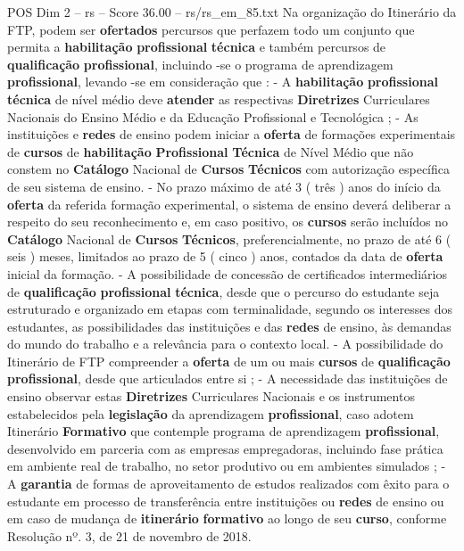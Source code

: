 \begin{textsample}{POS Dim 2 – rs – Score 36.00 – rs/rs\_em\_85.txt}
Na organização do Itinerário da FTP, podem ser \textbf{ofertados} percursos que perfazem todo um conjunto que permita a \textbf{habilitação} \textbf{profissional} \textbf{técnica} e também percursos de \textbf{qualificação} \textbf{profissional}, incluindo -se o programa de aprendizagem \textbf{profissional}, levando -se em consideração que : - A \textbf{habilitação} \textbf{profissional} \textbf{técnica} de nível médio deve \textbf{atender} as respectivas \textbf{Diretrizes} Curriculares Nacionais do Ensino Médio e da Educação Profissional e Tecnológica ; - As instituições e \textbf{redes} de ensino podem iniciar a \textbf{oferta} de formações experimentais de \textbf{cursos} de \textbf{habilitação} \textbf{Profissional} \textbf{Técnica} de Nível Médio que não constem no \textbf{Catálogo} Nacional de \textbf{Cursos} \textbf{Técnicos} com autorização específica de seu sistema de ensino. - No prazo máximo de até 3 ( três ) anos do início da \textbf{oferta} da referida formação experimental, o sistema de ensino deverá deliberar a respeito do seu reconhecimento e, em caso positivo, os \textbf{cursos} serão incluídos no \textbf{Catálogo} Nacional de \textbf{Cursos} \textbf{Técnicos}, preferencialmente, no prazo de até 6 ( seis ) meses, limitados ao prazo de 5 ( cinco ) anos, contados da data de \textbf{oferta} inicial da formação. - A possibilidade de concessão de certificados intermediários de \textbf{qualificação} \textbf{profissional} \textbf{técnica}, desde que o percurso do estudante seja estruturado e organizado em etapas com terminalidade, segundo os interesses dos estudantes, as possibilidades das instituições e das \textbf{redes} de ensino, às demandas do mundo do trabalho e a relevância para o contexto local. - A possibilidade do Itinerário de FTP compreender a \textbf{oferta} de um ou mais \textbf{cursos} de \textbf{qualificação} \textbf{profissional}, desde que articulados entre si ; - A necessidade das instituições de ensino observar estas \textbf{Diretrizes} Curriculares Nacionais e os instrumentos estabelecidos pela \textbf{legislação} da aprendizagem \textbf{profissional}, caso adotem Itinerário \textbf{Formativo} que contemple programa de aprendizagem \textbf{profissional}, desenvolvido em parceria com as empresas empregadoras, incluindo fase prática em ambiente real de trabalho, no setor produtivo ou em ambientes simulados ; - A \textbf{garantia} de formas de aproveitamento de estudos realizados com êxito para o estudante em processo de transferência entre instituições ou \textbf{redes} de ensino ou em caso de mudança de \textbf{itinerário} \textbf{formativo} ao longo de seu \textbf{curso}, conforme Resolução nº. 3, de 21 de novembro de 2018.

\end{textsample}
